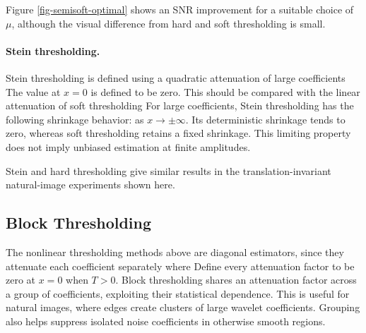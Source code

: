 Figure \ref{fig-semisoft-optimal} shows an SNR improvement for a suitable choice of $\mu$, although the visual difference from hard and soft thresholding is small.


\paragraph{Stein thresholding.}

Stein thresholding is defined using a quadratic attenuation of large coefficients
The value at $x=0$ is defined to be zero. This should be compared with the linear attenuation of soft thresholding
For large coefficients, Stein thresholding has the following shrinkage behavior:
as $x \rightarrow \pm \infty$. Its deterministic shrinkage tends to zero, whereas soft thresholding retains a fixed shrinkage. This limiting property does not imply unbiased estimation at finite amplitudes.


Stein and hard thresholding give similar results in the translation-invariant natural-image experiments shown here.

\subsection{Block Thresholding}

The nonlinear thresholding methods above are diagonal estimators, since they attenuate each coefficient separately
where 
Define every attenuation factor to be zero at $x=0$ when $T>0$. Block thresholding shares an attenuation factor across a group of coefficients, exploiting their statistical dependence. This is useful for natural images, where edges create clusters of large wavelet coefficients. Grouping also helps suppress isolated noise coefficients in otherwise smooth regions.

